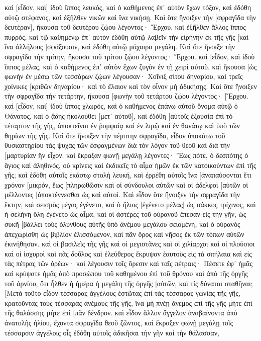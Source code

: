 καὶ [εἶδον, καὶ] ἰδοὺ ἵππος λευκός, καὶ ὁ καθήμενος ἐπ᾽ αὐτὸν ἔχων τόξον, καὶ ἐδόθη αὐτῷ στέφανος, καὶ ἐξῆλθεν νικῶν καὶ ἵνα νικήσῃ. 
Καὶ ὅτε ἤνοιξεν τὴν [σφραγῖδα τὴν δευτέραν], ἤκουσα τοῦ δευτέρου ζῴου λέγοντος· Ἔρχου. 
καὶ ἐξῆλθεν ἄλλος ἵππος πυρρός, καὶ τῷ καθημένῳ ἐπ᾽ αὐτὸν ἐδόθη αὐτῷ λαβεῖν τὴν εἰρήνην ἐκ τῆς γῆς [καὶ ἵνα ἀλλήλους [σφάξουσιν, καὶ ἐδόθη αὐτῷ μάχαιρα μεγάλη. 
Καὶ ὅτε ἤνοιξε τὴν σφραγῖδα τὴν τρίτην, ἤκουσα τοῦ τρίτου ζῴου λέγοντος· Ἔρχου. καὶ [εἶδον, καὶ ἰδοὺ ἵππος μέλας, καὶ ὁ καθήμενος ἐπ᾽ αὐτὸν ἔχων ζυγὸν ἐν τῇ χειρὶ αὐτοῦ. 
καὶ ἤκουσα [ὡς φωνὴν ἐν μέσῳ τῶν τεσσάρων ζῴων λέγουσαν· Χοῖνιξ σίτου δηναρίου, καὶ τρεῖς χοίνικες [κριθῶν δηναρίου· καὶ τὸ ἔλαιον καὶ τὸν οἶνον μὴ ἀδικήσῃς. 
Καὶ ὅτε ἤνοιξεν τὴν σφραγῖδα τὴν τετάρτην, ἤκουσα [φωνὴν τοῦ τετάρτου ζῴου λέγοντος· [Ἔρχου. 
καὶ [εἶδον, καὶ] ἰδοὺ ἵππος χλωρός, καὶ ὁ καθήμενος ἐπάνω αὐτοῦ ὄνομα αὐτῷ ὁ Θάνατος, καὶ ὁ ᾅδης ἠκολούθει [μετ᾽ αὐτοῦ], καὶ ἐδόθη [αὐτοῖς ἐξουσία ἐπὶ τὸ τέταρτον τῆς γῆς, ἀποκτεῖναι ἐν ῥομφαίᾳ καὶ ἐν λιμῷ καὶ ἐν θανάτῳ καὶ ὑπὸ τῶν θηρίων τῆς γῆς. 
Καὶ ὅτε ἤνοιξεν τὴν πέμπτην σφραγῖδα, εἶδον ὑποκάτω τοῦ θυσιαστηρίου τὰς ψυχὰς τῶν ἐσφαγμένων διὰ τὸν λόγον τοῦ θεοῦ καὶ διὰ τὴν [μαρτυρίαν ἣν εἶχον. 
καὶ ἔκραξαν φωνῇ μεγάλῃ λέγοντες· Ἕως πότε, ὁ δεσπότης ὁ ἅγιος καὶ ἀληθινός, οὐ κρίνεις καὶ ἐκδικεῖς τὸ αἷμα ἡμῶν ἐκ τῶν κατοικούντων ἐπὶ τῆς γῆς; 
καὶ ἐδόθη αὐτοῖς ἑκάστῳ στολὴ λευκή, καὶ ἐρρέθη αὐτοῖς ἵνα [ἀναπαύσονται ἔτι χρόνον [μικρόν, ἕως [πληρωθῶσιν καὶ οἱ σύνδουλοι αὐτῶν καὶ οἱ ἀδελφοὶ [αὐτῶν οἱ μέλλοντες [ἀποκτέννεσθαι ὡς καὶ αὐτοί. 
Καὶ εἶδον ὅτε ἤνοιξεν τὴν σφραγῖδα τὴν ἕκτην, καὶ σεισμὸς μέγας ἐγένετο, καὶ ὁ ἥλιος [ἐγένετο μέλας] ὡς σάκκος τρίχινος, καὶ ἡ σελήνη ὅλη ἐγένετο ὡς αἷμα, 
καὶ οἱ ἀστέρες τοῦ οὐρανοῦ ἔπεσαν εἰς τὴν γῆν, ὡς συκῆ [βάλλει τοὺς ὀλύνθους αὐτῆς ὑπὸ ἀνέμου μεγάλου σειομένη, 
καὶ ὁ οὐρανὸς ἀπεχωρίσθη ὡς βιβλίον ἑλισσόμενον, καὶ πᾶν ὄρος καὶ νῆσος ἐκ τῶν τόπων αὐτῶν ἐκινήθησαν. 
καὶ οἱ βασιλεῖς τῆς γῆς καὶ οἱ μεγιστᾶνες καὶ οἱ χιλίαρχοι καὶ οἱ πλούσιοι καὶ οἱ ἰσχυροὶ καὶ πᾶς δοῦλος καὶ ἐλεύθερος ἔκρυψαν ἑαυτοὺς εἰς τὰ σπήλαια καὶ εἰς τὰς πέτρας τῶν ὀρέων· 
καὶ λέγουσιν τοῖς ὄρεσιν καὶ ταῖς πέτραις· Πέσετε ἐφ᾽ ἡμᾶς καὶ κρύψατε ἡμᾶς ἀπὸ προσώπου τοῦ καθημένου ἐπὶ τοῦ θρόνου καὶ ἀπὸ τῆς ὀργῆς τοῦ ἀρνίου, 
ὅτι ἦλθεν ἡ ἡμέρα ἡ μεγάλη τῆς ὀργῆς [αὐτῶν, καὶ τίς δύναται σταθῆναι; 
[Μετὰ τοῦτο εἶδον τέσσαρας ἀγγέλους ἑστῶτας ἐπὶ τὰς τέσσαρας γωνίας τῆς γῆς, κρατοῦντας τοὺς τέσσαρας ἀνέμους τῆς γῆς, ἵνα μὴ πνέῃ ἄνεμος ἐπὶ τῆς γῆς μήτε ἐπὶ τῆς θαλάσσης μήτε ἐπὶ [πᾶν δένδρον. 
καὶ εἶδον ἄλλον ἄγγελον ἀναβαίνοντα ἀπὸ ἀνατολῆς ἡλίου, ἔχοντα σφραγῖδα θεοῦ ζῶντος, καὶ ἔκραξεν φωνῇ μεγάλῃ τοῖς τέσσαρσιν ἀγγέλοις οἷς ἐδόθη αὐτοῖς ἀδικῆσαι τὴν γῆν καὶ τὴν θάλασσαν, 
